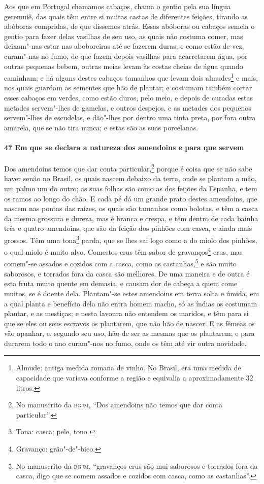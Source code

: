 Aos que em Portugal chamamos cabaços, chama o gentio pela sua língua geremuiê, das quais
têm entre si muitas castas de diferentes feições, tirando as abóboras compridas, de que
dissemos atrás. Essas abóboras ou cabaços semeia o gentio para fazer delas vasilhas de seu
uso, as quais não costuma comer, mas deixam"-nas estar nas aboboreiras até se fazerem
duras, e como estão de vez, curam"-nas no fumo, de que fazem depois vasilhas para
acarretarem água, por outras pequenas bebem, outras meias levam às costas cheias de água
quando caminham; e há alguns destes cabaços tamanhos que levam dois almudes\footnote{
Almude: antiga medida romana de vinho. No Brasil, era uma medida de capacidade que variava
conforme a região e equivalia a aproximadamente 32 litros.} e mais, nos quais guardam as
sementes que hão de plantar; e costumam também cortar esses cabaços em verdes, como estão
duros, pelo meio, e depois de curadas estas metades servem"-lhes de gamelas, e outros
despejos, e as metades dos pequenos servem"-lhes de escudelas, e dão"-lhes por dentro uma
tinta preta, por fora outra amarela, que se não tira nunca; e estas são as suas
porcelanas.

\paragraph{47 Em que se declara a natureza dos amendoins e para que servem}

Dos amendoins temos que dar conta particular,\footnote{ No manuscrito da \textsc{bgjm},
``Dos amendoins não temos que dar conta particular''.} porque é coisa que se não sabe
haver senão no Brasil, os quais nascem debaixo da terra, onde se plantam a mão, um palmo
um do outro; as suas folhas são como as dos feijões da Espanha, e tem os ramos ao longo do
chão. E cada pé dá um grande prato destes amendoins, que nascem nas pontas das raízes, os
quais são tamanhos como bolotas, e têm a casca da mesma grossura e dureza, mas é branca e
crespa, e têm dentro de cada bainha três e quatro amendoins, que são da feição dos pinhões
com casca, e ainda mais grossos. Têm uma tona\footnote{ Tona: casca; pele, tono.} parda,
que se lhes sai logo como a do miolo dos pinhões, o qual miolo é muito alvo. Comestos crus
têm sabor de gravanços\footnote{ Gravanço: grão"-de"-bico.} crus, mas comem"-se assados e
cozidos com a casca, como as castanhas,\footnote{ No manuscrito da \textsc{bgjm},
``gravanços crus são mui saborosos e torrados fora da casca, digo que se comem assados e
cozidos com casca, como as castanhas''.} e são muito saborosos, e torrados fora da casca
são melhores. De uma maneira e de outra é esta fruta muito quente em demasia, e causam dor
de cabeça a quem come muitos, se é doente dela.
Plantam"-se estes amendoins em terra solta e úmida, em a qual planta e
benefício dela não entra homem macho, só as índias os costumam plantar, e as mestiças; e
nesta lavoura não entendem os maridos, e têm para si que se eles ou seus escravos os
plantarem, que não hão de nascer. E as fêmeas os vão
apanhar, e, segundo seu uso, hão de ser as mesmas que os plantarem; e para durarem todo o
ano curam"-nos no fumo, onde os têm até vir outra novidade.

